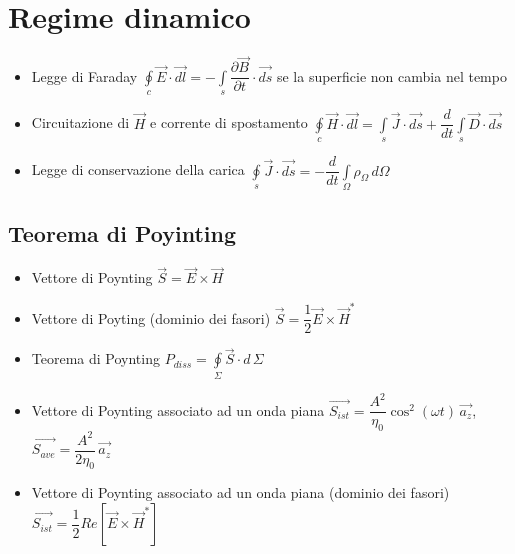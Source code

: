 \documentclass{article}
\begin{document}
\newpage

\section{Regime dinamico}
\begin{itemize}
	\item Legge di Faraday \(\displaystyle \oint\limits_c \vec{E} \cdot \vec{dl} = - \int\limits_s \dfrac{\partial \vec{B}}{\partial t} \cdot \vec{ds} \) se la superficie non cambia nel tempo
	\item Circuitazione di \( \vec{H} \) e corrente di spostamento \(\displaystyle \oint\limits_c \vec{H} \cdot \vec{dl} = \int\limits_s \vec{J} \cdot \vec{ds} + \dfrac{d}{dt} \int\limits_s \vec{D} \cdot \vec{ds} \)
	\item Legge di conservazione della carica \(\displaystyle \oint\limits_s \vec{J} \cdot \vec{ds} = -\dfrac{d}{dt} \int\limits_\Omega \rho_\Omega \, d\Omega \)
	\end{itemize}
	
\subsection{Teorema di Poyinting}
\begin{itemize}
	\item Vettore di Poynting \( \vec{S} = \vec{E} \times \vec{H} \)
	\item Vettore di Poyting (dominio dei fasori) \( \vec{S} = \dfrac{1}{2} \vec{E} \times \vec{H}^{*} \)
	\item Teorema di Poynting \( P_{diss} = \oint\limits_\Sigma \vec{S} \cdot d \,\Sigma \)
	\item Vettore di Poynting associato ad un onda piana \( \vec{S_{ist}} = \dfrac{A^2}{\eta_0} \cos^2{(\omega t)} \, \vec{a_z} \), \( \vec{S_{ave}} = \dfrac{A^2}{2 \eta_0} \, \vec{a_z}\)
	\item Vettore di Poynting associato ad un onda piana (dominio dei fasori) \( \vec{S_{ist}} = \dfrac{1}{2} Re[\vec{E} \times \vec{H}^{*}] \)
\end{itemize}
\end{document}
